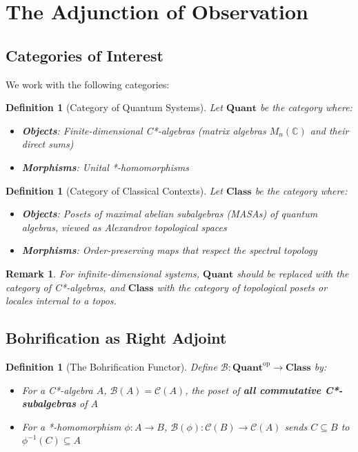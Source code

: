 \documentclass[11pt]{article}
\newtheorem{definition}[theorem]{Definition}
\newtheorem{remark}[theorem]{Remark}
\begin{document}
\section{The Adjunction of Observation}
\label{adjunction}

\subsection{Categories of Interest}
\label{categories}

We work with the following categories:

\begin{definition}[Category of Quantum Systems]\label{def:quant}
Let $\mathbf{Quant}$ be the category where:
\begin{itemize}
\item \textbf{Objects}: Finite-dimensional C*-algebras (matrix algebras $M_n(\mathbb{C})$ and their direct sums)
\item \textbf{Morphisms}: Unital *-homomorphisms
\end{itemize}
\end{definition}

\begin{definition}[Category of Classical Contexts]\label{def:class}
Let $\mathbf{Class}$ be the category where:
\begin{itemize}
\item \textbf{Objects}: Posets of maximal abelian subalgebras (MASAs) of quantum algebras, viewed as Alexandrov topological spaces
\item \textbf{Morphisms}: Order-preserving maps that respect the spectral topology
\end{itemize}
\end{definition}

\begin{remark}
For infinite-dimensional systems, $\mathbf{Quant}$ should be replaced with the category of C*-algebras, and $\mathbf{Class}$ with the category of topological posets or locales internal to a topos.
\end{remark}

\subsection{Bohrification as Right Adjoint}
\label{bohrification}

\begin{definition}[The Bohrification Functor]\label{def:bohrification}
Define $\mathcal{B}: \mathbf{Quant}^{\text{op}} \to \mathbf{Class}$ by:
\begin{itemize}
\item For a C*-algebra $A$, $\mathcal{B}(A) = \mathcal{C}(A)$, the poset of \textbf{all commutative C*-subalgebras} of $A$
\item For a *-homomorphism $\phi: A \to B$, $\mathcal{B}(\phi): \mathcal{C}(B) \to \mathcal{C}(A)$ sends $C \subseteq B$ to $\phi^{-1}(C) \subseteq A$
\end{itemize}
\end{definition}
\end{document}
